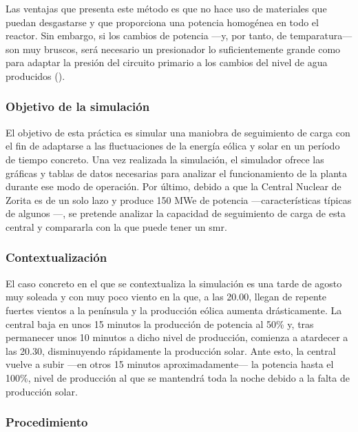 \begin{itemize}
  Las ventajas que presenta este método es que no hace uso de materiales que puedan desgastarse y que proporciona una potencia homogénea en todo el reactor. Sin embargo, si los cambios de potencia ---y, por tanto, de temparatura--- son muy bruscos, será necesario un presionador lo suficientemente grande como para adaptar la presión del circuito primario a los cambios del nivel de agua producidos (\cite{seguimiento_carga_josep_rey}).
\end{itemize}

\subsubsection{Objetivo de la simulación}

El objetivo de esta práctica es simular una maniobra de seguimiento de carga con el fin de adaptarse a las fluctuaciones de la energía eólica y solar en un período de tiempo concreto. Una vez realizada la simulación, el simulador ofrece las gráficas y tablas de datos necesarias para analizar el funcionamiento de la planta durante ese modo de operación. Por último, debido a que la Central Nuclear de Zorita es de un solo lazo y produce 150 MWe de potencia ---características típicas de algunos ---, se pretende analizar la capacidad de seguimiento de carga de esta central y compararla con la que puede tener un \acrshort{smr}.

\subsubsection{Contextualización}

El caso concreto en el que se contextualiza la simulación es una tarde de agosto muy soleada y con muy poco viento en la que, a las 20.00, llegan de repente fuertes vientos a la península y la producción eólica aumenta drásticamente. La central baja en unos 15 minutos la producción de potencia al 50\% y, tras permanecer unos 10 minutos a dicho nivel de producción, comienza a atardecer a las 20.30, disminuyendo rápidamente la producción solar. Ante esto, la central vuelve a subir ---en otros 15 minutos aproximadamente--- la potencia hasta el 100\%, nivel de producción al que se mantendrá toda la noche debido a la falta de producción solar.

\subsubsection{Procedimiento} \label{procedimiento}

